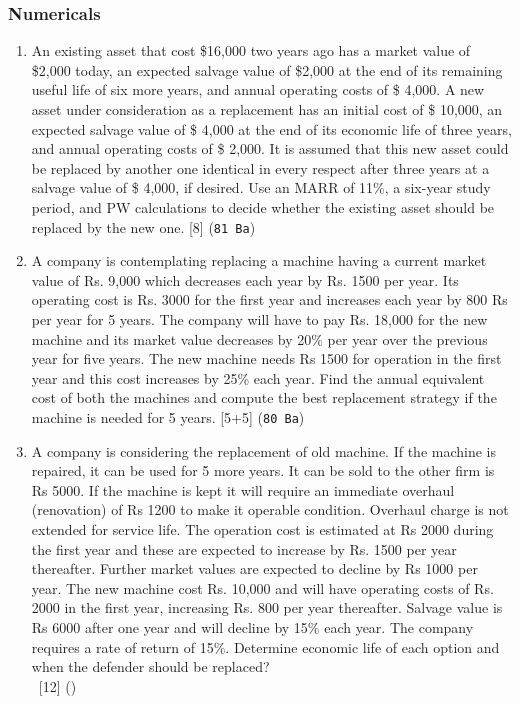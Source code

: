 \documentclass[12pt]{article}
\newcommand{\enter}{\\\textcolor{white}{1}}
\begin{document}
		\subsubsection{Numericals}
			\begin{enumerate}
				\item An existing asset that cost \$16,000 two years ago has a market value of \$2,000 today, an expected salvage value of \$2,000 at the end of its remaining useful life of six more years, and annual operating costs of \$ 4,000. A new asset under consideration as a replacement has an initial cost of \$ 10,000, an expected salvage value of \$ 4,000 at the end of its economic life of three years, and annual operating costs of \$ 2,000. It is assumed that this new asset could be replaced by another one identical in every respect after three years at a salvage value of \$ 4,000, if desired. Use an MARR of 11\%, a six-year study period, and PW calculations to decide whether the existing asset should be replaced by the new one. \hfill [8] (\texttt{81 Ba})

				\item A company is contemplating replacing a machine having a current market value of Rs. 9,000 which decreases each year by Rs. 1500 per year. Its operating cost is Rs. 3000 for the first year and increases each year by 800 Rs per year for 5 years. The company will have to pay Rs. 18,000 for the new machine and its market value decreases by 20\% per year over the previous year for five years. The new machine needs Rs 1500 for operation in the first year and this cost increases by 25\% each year. Find the annual equivalent cost of both the machines and compute the best replacement strategy if the machine is needed for 5 years. \hfill [5+5] (\texttt{80 Ba})

				\item A company is considering the replacement of old machine. If the machine is repaired, it can be used for 5 more years. It can be sold to the other firm is Rs 5000. If the machine is kept it will require an immediate overhaul (renovation) of Rs 1200 to make it operable condition. Overhaul charge is not extended for service life. The operation cost is estimated at Rs 2000 during the first year and these are expected to increase by Rs. 1500 per year thereafter. Further market values are expected to decline by Rs 1000 per year. The new machine cost Rs. 10,000 and will have operating costs of Rs. 2000 in the first year, increasing Rs. 800 per year thereafter. Salvage value is Rs 6000 after one year and will decline by 15\% each year. The company requires a rate of return of 15\%. Determine economic life of each option and when the defender should be replaced?
				\enter\hfill [12] ()
				

\end{enumerate}
\end{document}
